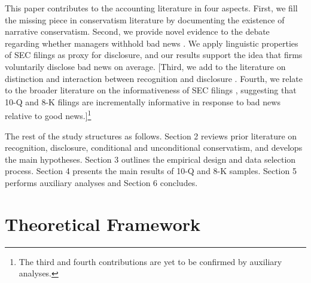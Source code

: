 \documentclass[a4paper]{article}
\begin{document}
\begin{spacing}{2}

This paper contributes to the accounting literature in four aspects. First, we fill the missing piece in conservatism literature by documenting the existence of narrative conservatism. Second, we provide novel evidence to the debate regarding whether managers withhold bad news \citep{baoManagersDiscloseWithhold2019, kothariManagersWithholdBad2009, skinnerWhyFirmsVoluntarily1994, skinnerEarningsDisclosuresStockholder1997}. We apply linguistic properties of SEC filings as proxy for disclosure, and our results support the idea that firms voluntarily disclose bad news on average. [Third, we add to the literature on distinction and interaction between recognition and disclosure \citep*{schipperRequiredDisclosuresFinancial2007, barthMarketEffectsRecognition2003, aboodyRecognitionDisclosureOil1996}. Fourth, we relate to the broader literature on the informativeness of SEC filings \citep*{lermanNewForm8K2010, alfordExtensionsViolationsStatutory1994, liAnnualReportReadability2008, liInformationContentForwardLooking2010}, suggesting that 10-Q and 8-K filings are incrementally informative in response to bad news relative to good news.]\footnote{ The third and fourth contributions are yet to be confirmed by auxiliary analyses.}

The rest of the study structures as follows. Section 2 reviews prior literature on recognition, disclosure, conditional and unconditional conservatism, and develops the main hypotheses. Section 3 outlines the empirical design and data selection process. Section 4 presents the main results of 10-Q and 8-K samples. Section 5 performs auxiliary analyses and Section 6 concludes.

\section{Theoretical Framework}

\end{spacing}
\end{document}
